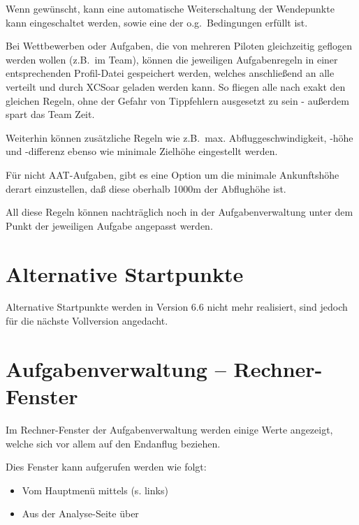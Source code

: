 Wenn gewünscht, kann eine automatische Weiterschaltung der Wendepunkte kann eingeschaltet werden, sowie eine der o.g.\ Bedingungen erfüllt ist.

\tip Bei Wettbewerben oder Aufgaben, die von mehreren Piloten gleichzeitig geflogen werden wollen (z.B.\ im Team), können die  jeweiligen Aufgabenregeln  in einer entsprechenden Profil-Datei  gespeichert werden, welches anschließend an alle verteilt und durch \textsf{XCSoar} geladen werden kann. So fliegen alle nach exakt den gleichen Regeln, ohne der Gefahr von Tippfehlern ausge\-setzt zu sein - außerdem spart das Team Zeit.

Weiterhin können zusätzliche Regeln wie z.B.\ max. Abfluggeschwindigkeit, -höhe und -differenz ebenso wie minimale Zielhöhe eingestellt werden.

Für nicht AAT-Aufgaben, gibt es eine Option um die minimale Ankunftshöhe derart einzustellen, daß diese oberhalb 1000m der Abflughöhe ist.

All diese Regeln  können    nachträglich noch in der  Aufgabenverwaltung  unter dem Punkt    der jeweiligen Aufgabe angepasst werden.


\section{Alternative Startpunkte}\label{sec:alternate-starts}

Alternative Startpunkte werden in Version 6.6 nicht mehr realisiert, sind jedoch für die nächste Vollversion angedacht.

\section{Aufgabenverwaltung -- Rechner-Fenster} \label{sec:task-calc-dial}
Im Rechner-Fenster  der Aufgabenverwaltung werden einige Werte angezeigt, welche sich vor allem auf den Endanflug beziehen.

Dies Fenster kann aufgerufen werden wie folgt:
\begin{itemize}
\item Vom Hauptmenü mittels (s. links)
\item Aus der Analyse-Seite über \blink{}\blink~
\end{itemize}

